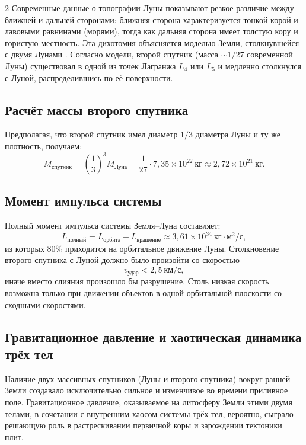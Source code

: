 \documentclass[11pt,a4paper]{article}
\begin{document}
\begin{multicols}{2}
		Современные данные о топографии Луны показывают резкое различие между ближней и дальней сторонами: ближняя сторона характеризуется тонкой корой и лавовыми равнинами (морями), тогда как дальняя сторона имеет толстую кору и гористую местность. Эта дихотомия объясняется моделью Земли, столкнувшейся с двумя Лунами \cite{JutziAsphaug2011}. Согласно модели, второй спутник (масса \(\sim 1/27\) современной Луны) существовал в одной из точек Лагранжа \(L_4\) или \(L_5\) и медленно столкнулся с Луной, распределившись по её поверхности.
		
		\subsection{Расчёт массы второго спутника}
		
		Предполагая, что второй спутник имел диаметр \(1/3\) диаметра Луны и ту же плотность, получаем:
		{\small
			\[
			M_{\text{спутник}} = \left(\frac{1}{3}\right)^3 M_{\text{Луна}} = \frac{1}{27} \cdot 7,35 \times 10^{22}\ \text{кг} \approx 2,72 \times 10^{21}\ \text{кг}.
			\]}
		
		\subsection{Момент импульса системы}
		
		Полный момент импульса системы Земля–Луна составляет:
		\[
		L_{\text{полный}} = L_{\text{орбита}} + L_{\text{вращение}} \approx 3,61 \times 10^{34}\ \text{кг}\cdot\text{м}^2/\text{с},
		\]
		из которых 80\% приходится на орбитальное движение Луны. Столкновение второго спутника с Луной должно было произойти со скоростью
		\[
		v_{\text{удар}} < 2,5\ \text{км/с},
		\]
		иначе вместо слияния произошло бы разрушение. Столь низкая скорость возможна только при движении объектов в одной орбитальной плоскости со сходными скоростями.
		
		\subsection{Гравитационное давление и хаотическая динамика трёх тел}
		
		Наличие двух массивных спутников (Луны и второго спутника) вокруг ранней Земли создавало исключительно сильное и изменчивое во времени приливное поле. Гравитационное давление, оказываемое на литосферу Земли этими двумя телами, в сочетании с внутренним хаосом системы трёх тел, вероятно, сыграло решающую роль в растрескивании первичной коры и зарождении тектоники плит.
		

\end{multicols}
\end{document}

